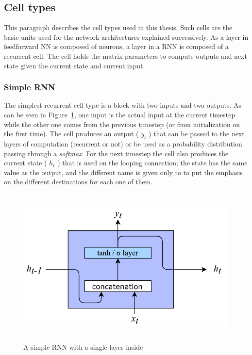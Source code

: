 \subsection{Cell types}
This paragraph describes the  cell types used in this thesis. Such cells are the basic units used for the network architectures explained successively. As a layer in feedforward NN is composed of neurons, a layer in a RNN is composed of a recurrent cell. The cell holds the matrix parameters to compute outputs and next state given the current state and current input.

\subsubsection{Simple RNN}
The simplest recurrent cell type is a block with two inputs and two outputs. As can be seen in Figure~\ref{fig:simpleRNN}, one input is the actual input at the current timestep while the other one comes from the previous timestep (or from initialization on the first time). The cell produces an output ( \( y_{t} \) ) that can be passed to the next layers of computation (recurrent or not) or be used as a probability distribution passing through a \textit{softmax}. For the next timestep the cell also produces the current state ( \( h_{t} \) ) that is used on the looping connection; the state has the same value as the output, and the different name is given only to to put the emphasis on the different destinations for each one of them.


\begin{figure}[!htbp]
    \centering
    \includegraphics[max width=\linewidth,max height=8cm,keepaspectratio]{figures/simpleRNN}
    \caption{A simple RNN with a single layer inside}\label{fig:simpleRNN}
\end{figure}

